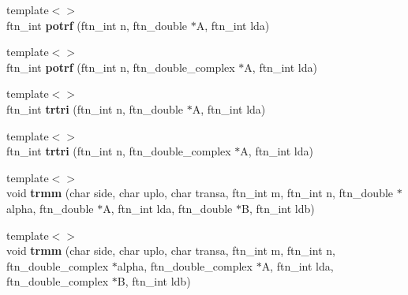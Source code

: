 \begin{DoxyCompactItemize}
\item 
\hypertarget{classsddk_1_1linalg_3_01_g_p_u_01_4_a2daffabf3c214eca5c33c9617a8c946c}{}{\footnotesize template$<$$>$ }\\ftn\+\_\+int {\bfseries potrf} (ftn\+\_\+int n, ftn\+\_\+double $\ast$A, ftn\+\_\+int lda)\label{classsddk_1_1linalg_3_01_g_p_u_01_4_a2daffabf3c214eca5c33c9617a8c946c}

\item 
\hypertarget{classsddk_1_1linalg_3_01_g_p_u_01_4_af2f73104cc2fb6480f695522e3fdea03}{}{\footnotesize template$<$$>$ }\\ftn\+\_\+int {\bfseries potrf} (ftn\+\_\+int n, ftn\+\_\+double\+\_\+complex $\ast$A, ftn\+\_\+int lda)\label{classsddk_1_1linalg_3_01_g_p_u_01_4_af2f73104cc2fb6480f695522e3fdea03}

\item 
\hypertarget{classsddk_1_1linalg_3_01_g_p_u_01_4_aca596e3883f019c2f4d3de47817fd4c1}{}{\footnotesize template$<$$>$ }\\ftn\+\_\+int {\bfseries trtri} (ftn\+\_\+int n, ftn\+\_\+double $\ast$A, ftn\+\_\+int lda)\label{classsddk_1_1linalg_3_01_g_p_u_01_4_aca596e3883f019c2f4d3de47817fd4c1}

\item 
\hypertarget{classsddk_1_1linalg_3_01_g_p_u_01_4_aa31d61b49f67830e5123f4e6e0402306}{}{\footnotesize template$<$$>$ }\\ftn\+\_\+int {\bfseries trtri} (ftn\+\_\+int n, ftn\+\_\+double\+\_\+complex $\ast$A, ftn\+\_\+int lda)\label{classsddk_1_1linalg_3_01_g_p_u_01_4_aa31d61b49f67830e5123f4e6e0402306}

\item 
\hypertarget{classsddk_1_1linalg_3_01_g_p_u_01_4_a5cb0aa62e221d24404e5cea9926b05e5}{}{\footnotesize template$<$$>$ }\\void {\bfseries trmm} (char side, char uplo, char transa, ftn\+\_\+int m, ftn\+\_\+int n, ftn\+\_\+double $\ast$alpha, ftn\+\_\+double $\ast$A, ftn\+\_\+int lda, ftn\+\_\+double $\ast$B, ftn\+\_\+int ldb)\label{classsddk_1_1linalg_3_01_g_p_u_01_4_a5cb0aa62e221d24404e5cea9926b05e5}

\item 
\hypertarget{classsddk_1_1linalg_3_01_g_p_u_01_4_a901911984f3114c682e801a3e3ae3d26}{}{\footnotesize template$<$$>$ }\\void {\bfseries trmm} (char side, char uplo, char transa, ftn\+\_\+int m, ftn\+\_\+int n, ftn\+\_\+double\+\_\+complex $\ast$alpha, ftn\+\_\+double\+\_\+complex $\ast$A, ftn\+\_\+int lda, ftn\+\_\+double\+\_\+complex $\ast$B, ftn\+\_\+int ldb)\label{classsddk_1_1linalg_3_01_g_p_u_01_4_a901911984f3114c682e801a3e3ae3d26}


\end{DoxyCompactItemize}
